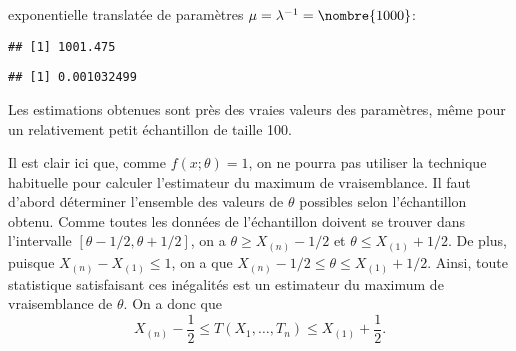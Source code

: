 \begin{solution}{4.9}
\begin{enumerate}
      exponentielle translatée de paramètres $\mu = \lambda^{-1} =
      \nombre{1000}$:
\begin{knitrout}
\color{fgcolor}\begin{kframe}
\begin{alltt}
 \hlkwb{<-} \hlstd{(}\hlstd{,}  \hlstd{=} \hlstd{)} \hlopt{+} 
\end{alltt}
\begin{verbatim}
## [1] 1001.475
\end{verbatim}
\begin{alltt}
 \hlopt{/}  \hlopt{-} 
\end{alltt}
\begin{verbatim}
## [1] 0.001032499
\end{verbatim}
\end{kframe}
\end{knitrout}
      Les estimations obtenues sont près des vraies valeurs des
      paramètres, même pour un relativement petit échantillon de
      taille 100.
    \end{enumerate}
  
\end{solution}
\begin{solution}{4.10}
    Il est clair ici que, comme $f(x;\theta) = 1$, on ne pourra pas
    utiliser la technique habituelle pour calculer l'estimateur du
    maximum de vraisemblance. Il faut d'abord déterminer l'ensemble
    des valeurs de $\theta$ possibles selon l'échantillon obtenu.
    Comme toutes les données de l'échantillon doivent se trouver dans
    l'intervalle $[\theta - 1/2, \theta + 1/2]$, on a $\theta \geq
    X_{(n)} - 1/2$ et $\theta \leq X_{(1)} + 1/2$. De plus, puisque
    $X_{(n)} - X_{(1)} \leq 1$, on a que $X_{(n)} - 1/2 \leq \theta
    \leq X_{(1)} + 1/2$. Ainsi, toute statistique satisfaisant ces
    inégalités est un estimateur du maximum de vraisemblance de
    $\theta$. On a donc que
    \begin{displaymath}
      X_{(n)} - \frac{1}{2} \leq T(X_1, \dots, T_n) \leq X_{(1)} + \frac{1}{2}.
    \end{displaymath}
  
\end{solution}
